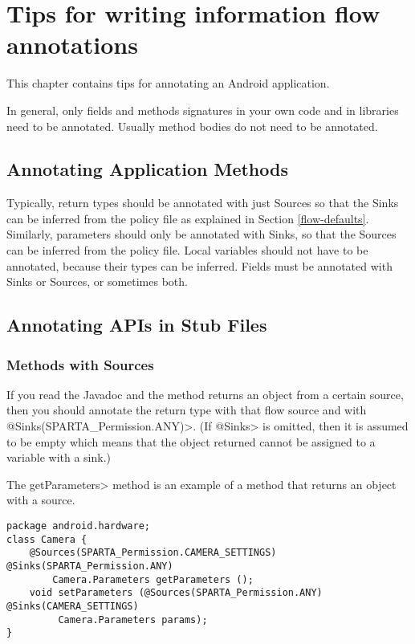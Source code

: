 \htmlhr
\chapter{Tips for writing information flow annotations\label{app-annotation}}

This chapter contains tips for annotating an Android application.

In general, only fields and methods signatures in your own code and in
libraries need to be annotated. Usually method bodies do not need to be
annotated.


\section{Annotating Application Methods\label{sec:annomethods}}

Typically, return types should be annotated with just Sources so that the Sinks can be
 inferred from the policy file as explained in Section \ref{flow-defaults}. Similarly, parameters should
  only be annotated with Sinks, so that the Sources can be inferred from  the policy file.
    Local variables should not have to be annotated, because their types can be inferred. Fields 
    must be annotated with  Sinks or Sources, or sometimes both. 

\section{Annotating APIs in Stub Files\label{sec:annoAPI}}

\subsection{Methods with Sources}
If you read the Javadoc and the method returns an object from a certain source, then you should annotate
the return type with that flow source and with \<@Sinks(SPARTA_Permission.ANY)>.  (If \<@Sinks> is omitted, then it is assumed to be empty
 which means that the object returned cannot be assigned to a variable with a sink.)

The \<getParameters> method is an example of a method that returns an object with a source.
\begin{Verbatim}
package android.hardware;
class Camera {
    @Sources(SPARTA_Permission.CAMERA_SETTINGS) @Sinks(SPARTA_Permission.ANY)
        Camera.Parameters getParameters ();
    void setParameters (@Sources(SPARTA_Permission.ANY) @Sinks(CAMERA_SETTINGS) 
         Camera.Parameters params);
}
\end{Verbatim}



